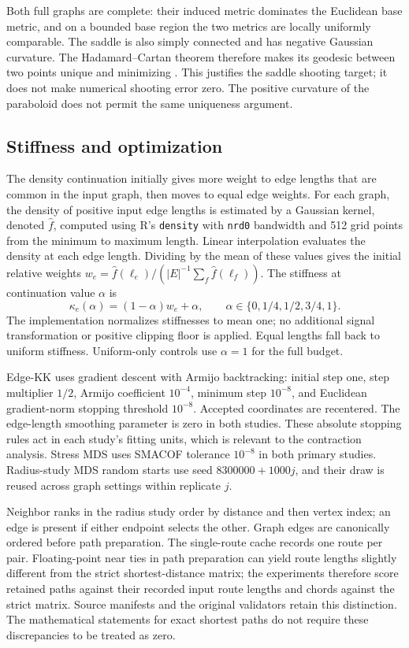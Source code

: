 \documentclass[11pt]{article}
\begin{document}
Both full graphs are complete: their induced metric dominates the Euclidean
base metric, and on a bounded base region the two metrics are locally uniformly
comparable. The saddle is also simply connected and has negative Gaussian
curvature. The Hadamard--Cartan theorem therefore makes its geodesic between
two points unique and minimizing \citep[Theorem 6.5.2, Corollary 6.5.3, and the
proof of Lemma 6.5.4, pp. 124--125]{gorodski2022}. This justifies the saddle
shooting target; it does not make numerical shooting error zero. The positive
curvature of the paraboloid does not permit the same uniqueness argument.

\subsection{Stiffness and optimization}
The density continuation initially gives more weight to edge lengths that
are common in the input graph, then moves to equal edge weights. For each
graph, the density of positive input edge lengths is estimated by a Gaussian
kernel, denoted $\widehat f$, computed using R's \texttt{density} with
\texttt{nrd0} bandwidth and 512 grid points from the minimum to maximum length.
Linear interpolation evaluates the density at each edge length. Dividing by
the mean of these values gives the initial relative weights
$w_e=\widehat f(\ell_e)/( |E|^{-1}\sum_f\widehat f(\ell_f))$. The stiffness at
continuation value $\alpha$ is
\[
 \kappa_e(\alpha)=(1-\alpha)w_e+\alpha,
 \qquad \alpha\in\{0,1/4,1/2,3/4,1\}.
\]
The implementation normalizes stiffnesses to mean one; no additional signal
transformation or positive clipping floor is applied. Equal lengths fall back
to uniform stiffness. Uniform-only controls use $\alpha=1$ for the full budget.

Edge-KK uses gradient descent with Armijo backtracking: initial step one,
step multiplier $1/2$, Armijo coefficient $10^{-4}$, minimum step $10^{-8}$,
and Euclidean gradient-norm stopping threshold $10^{-8}$. Accepted coordinates
are recentered. The edge-length smoothing parameter is zero in both studies.
These absolute stopping rules act in each study's fitting units, which is
relevant to the contraction analysis. Stress MDS uses SMACOF tolerance
$10^{-8}$ in both primary studies. Radius-study MDS random starts use seed $8300000+1000j$,
and their draw is reused across graph settings within replicate $j$.

Neighbor ranks in the radius study order by distance and then vertex index;
an edge is present if either endpoint selects the other. Graph edges are
canonically ordered before path preparation. The single-route cache records
one route per pair. Floating-point near ties in path preparation can yield
route lengths slightly different from the strict shortest-distance matrix;
the experiments therefore score retained paths against their recorded input
route lengths and chords against the strict matrix. Source manifests and
the original validators retain this distinction. The mathematical statements
for exact shortest paths do not require these discrepancies to be treated as
zero.
\end{document}
